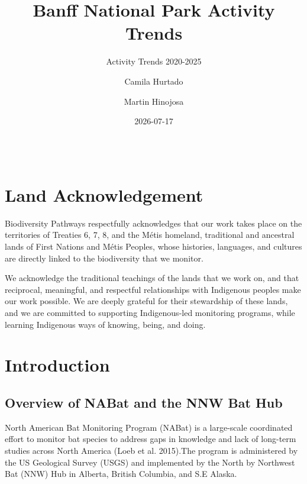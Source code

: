 \documentclass[
  letterpaper,
  DIV=11,
  numbers=noendperiod]{scrartcl}
\title{Banff National Park Activity Trends}
\subtitle{Activity Trends 2020-2025}
\author{Camila Hurtado \and Martin Hinojosa}
\date{2026-07-17}
\renewcommand*\contentsname{Table of contents}
\newcommand\contentsname{Table of contents}
\begin{document}
\maketitle

\clearpage

\renewcommand*\contentsname{Table of contents}
{
\hypersetup{linkcolor=black}
\setcounter{tocdepth}{3}
\tableofcontents
}

\begin{verbatim}
\end{verbatim}

\newpage{}

\section{Land Acknowledgement}\label{land-acknowledgement}

Biodiversity Pathways respectfully acknowledges that our work takes
place on the territories of Treaties 6, 7, 8, and the Métis homeland,
traditional and ancestral lands of First Nations and Métis Peoples,
whose histories, languages, and cultures are directly linked to the
biodiversity that we monitor.

We acknowledge the traditional teachings of the lands that we work on,
and that reciprocal, meaningful, and respectful relationships with
Indigenous peoples make our work possible. We are deeply grateful for
their stewardship of these lands, and we are committed to supporting
Indigenous-led monitoring programs, while learning Indigenous ways of
knowing, being, and doing.

\section{Introduction}\label{introduction}

\subsection{Overview of NABat and the NNW Bat
Hub}\label{overview-of-nabat-and-the-nnw-bat-hub}

North American Bat Monitoring Program (NABat) is a large-scale
coordinated effort to monitor bat species to address gaps in knowledge
and lack of long-term studies across North America (Loeb et al.
2015).The program is administered by the US Geological Survey (USGS) and
implemented by the North by Northwest Bat (NNW) Hub in Alberta, British
Columbia, and S.E Alaska.
\end{document}

